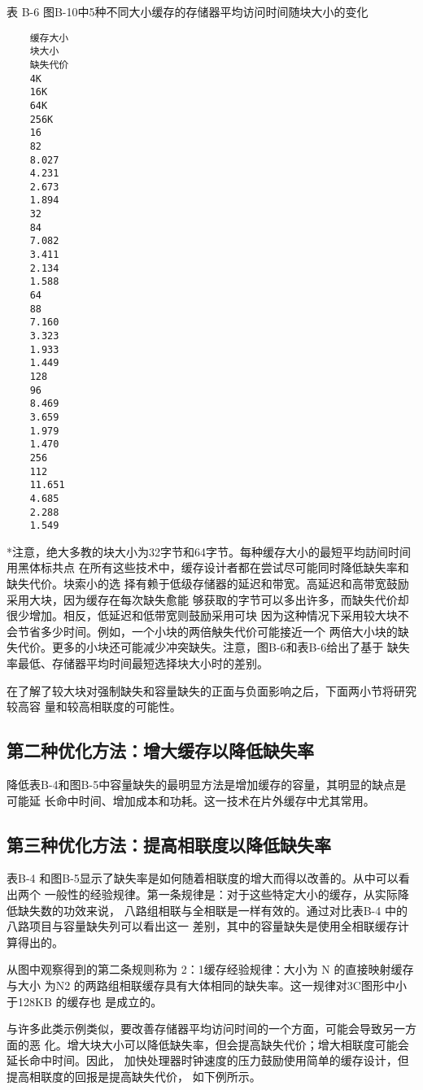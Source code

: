 表 B-6
图B-10中5种不同大小缓存的存储器平均访问时间随块大小的变化
\begin{verbatim}
    缓存大小
    块大小
    缺失代价
    4K
    16K
    64K
    256K
    16
    82
    8.027
    4.231
    2.673
    1.894
    32
    84
    7.082
    3.411
    2.134
    1.588
    64
    88
    7.160
    3.323
    1.933
    1.449
    128
    96
    8.469
    3.659
    1.979
    1.470
    256
    112
    11.651
    4.685
    2.288
    1.549
\end{verbatim}
*注意，绝大多教的块大小为32字节和64字节。每种缓存大小的最短平均訪间时间用黑体标共点
在所有这些技术中，缓存设计者都在尝试尽可能同时降低缺失率和缺失代价。块索小的选
择有赖于低级存储器的延迟和带宽。高延迟和高带宽鼓励采用大块，因为缓存在每次缺失愈能
够获取的字节可以多出许多，而缺失代价却很少增加。相反，低延迟和低带宽则鼓励采用可块
因为这种情况下采用较大块不会节省多少时间。例如，一个小块的两倍觖失代价可能接近一个
两倍大小块的缺失代价。更多的小块还可能减少冲突缺失。注意，图B-6和表B-6给出了基于
缺失率最低、存储器平均时间最短选择块大小时的差别。

在了解了较大块对强制缺失和容量缺失的正面与负面影响之后，下面两小节将研究较高容
量和较高相联度的可能性。

\subsection{第二种优化方法：增大缓存以降低缺失率}

降低表B-4和图B-5中容量缺失的最明显方法是增加缓存的容量，其明显的缺点是可能延
长命中时间、增加成本和功耗。这一技术在片外缓存中尤其常用。

\subsection{第三种优化方法：提高相联度以降低缺失率}

表B-4 和图B-5显示了缺失率是如何随着相联度的增大而得以改善的。从中可以看出两个
一般性的经验规律。第一条规律是：对于这些特定大小的缓存，从实际降低缺失数的功效来说，
八路组相联与全相联是一样有效的。通过对比表B-4 中的八路项目与容量缺失列可以看出这一
差别，其中的容量缺失是使用全相联缓存计算得出的。

从图中观察得到的第二条规则称为 2：1缓存经验规律：大小为 N 的直接映射缓存与大小
为N2 的两路组相联缓存具有大体相同的缺失率。这一规律对3C图形中小于128KB 的缓存也
是成立的。

与许多此类示例类似，要改善存储器平均访问时间的一个方面，可能会导致另一方面的恶
化。增大块大小可以降低缺失率，但会提高缺失代价；增大相联度可能会延长命中时间。因此，
加快处理器时钟速度的压力鼓励使用简单的缓存设计，但提高相联度的回报是提高缺失代价，
如下例所示。

